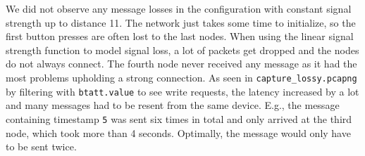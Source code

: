 \begin{exercise}
    We did not observe any message losses in the configuration with constant signal strength up to distance 11.
    The network just takes some time to initialize, so the first button presses are often lost to the last nodes.
    When using the linear signal strength function to model signal loss, a lot of packets get dropped and the nodes do not always connect.
    The fourth node never received any message as it had the most problems upholding a strong connection.
    As seen in \lstinline|capture_lossy.pcapng| by filtering with \lstinline|btatt.value| to see write requests, the latency increased by a lot and many messages had to be resent from the same device.
    E.g., the message containing timestamp \lstinline|5| was sent six times in total and only arrived at the third node, which took more than 4 seconds.
    Optimally, the message would only have to be sent twice.
\end{exercise}

\setcounter{exercise}{3}

\begin{exercise}
\end{exercise}

